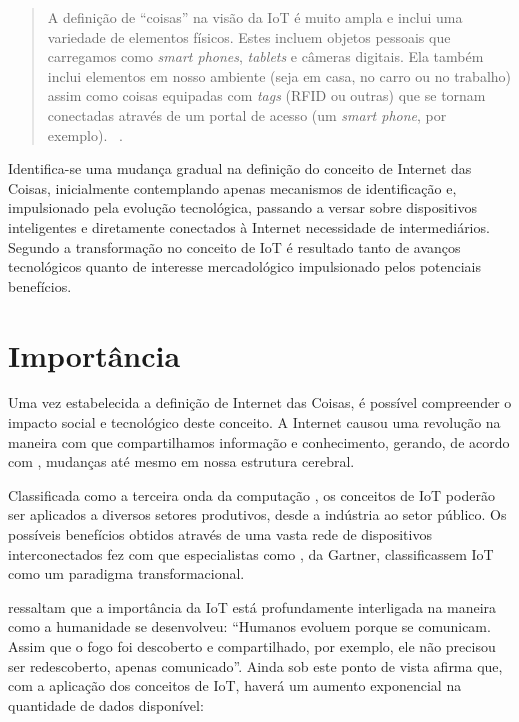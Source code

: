 \documentclass[twoside,english,brazilian]{UNISINOSmonografia}
\begin{document}
	\begin{quote}
		A definição de ``coisas'' na visão da IoT é muito ampla e inclui 
		uma variedade de elementos físicos. Estes incluem objetos pessoais 
		que carregamos como \textit{smart phones}, \textit{tablets} e 
		câmeras digitais. Ela também inclui elementos em nosso ambiente 
		(seja em casa, no carro ou no trabalho) assim como coisas 
		equipadas com \textit{tags} (RFID ou outras) que se tornam 
		conectadas através de um portal de acesso (um \textit{smart 
			phone}, por exemplo).~
		\cite{Coetzee2011}.
	\end{quote}
	
	Identifica-se uma mudança gradual na definição do conceito de Internet 
	das Coisas, inicialmente contemplando apenas mecanismos de 
	identificação e, impulsionado pela evolução tecnológica, passando a 
	versar sobre dispositivos inteligentes e diretamente conectados à 
	Internet necessidade de intermediários. Segundo 
	 a transformação no conceito de IoT é resultado 
	tanto de avanços tecnológicos quanto de interesse mercadológico 
	impulsionado pelos potenciais benefícios.


\section{Importância}

	Uma vez estabelecida a definição de Internet das Coisas, é possível 
	compreender o impacto social e tecnológico deste conceito. A Internet 
	causou uma revolução na maneira com que compartilhamos informação e 
	conhecimento, gerando, de acordo com , mudanças 
	até mesmo em nossa estrutura cerebral.
	
	Classificada como a terceira onda da computação \cite{Register2013}, 
	os conceitos de IoT poderão ser aplicados a diversos setores 
	produtivos, desde a indústria ao setor público. Os possíveis 
	benefícios obtidos através de uma vasta rede de dispositivos 
	interconectados fez com que especialistas como , 
	da Gartner, classificassem IoT como um paradigma transformacional.
	
	 ressaltam que a importância da IoT está 
	profundamente interligada na maneira como a humanidade se desenvolveu: 
	``Humanos evoluem porque se comunicam. Assim que o fogo foi descoberto 
	e compartilhado, por exemplo, ele não precisou ser redescoberto, 
	apenas comunicado''. Ainda sob este ponto de vista afirma que, com a 
	aplicação dos conceitos de IoT, haverá um aumento exponencial na 
	quantidade de dados disponível:
	
\end{document}
